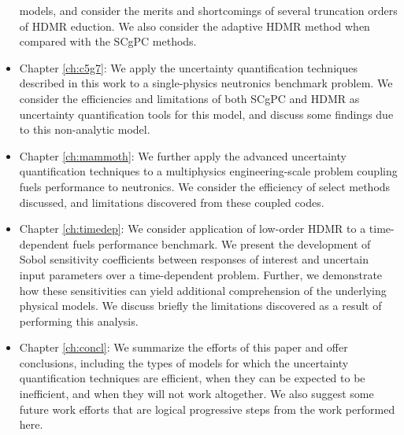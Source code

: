 \begin{itemize}
    models, and consider the merits and shortcomings of several truncation orders of HDMR 
    eduction.  We also consider the adaptive HDMR method when compared with the SCgPC
    methods.
  \item Chapter \ref{ch:c5g7}: We apply the uncertainty quantification techniques described in this work to a
    single-physics neutronics benchmark problem.  We consider the efficiencies and limitations of both
    SCgPC and HDMR as uncertainty
    quantification tools for this model, and discuss some findings due to this non-analytic model. 
  \item Chapter \ref{ch:mammoth}: We further apply the advanced uncertainty quantification techniques to a multiphysics
    engineering-scale problem coupling fuels performance to neutronics.  We consider the efficiency of select
    methods discussed, and limitations discovered from these coupled codes.
  \item Chapter \ref{ch:timedep}: We consider application of low-order HDMR to a time-dependent fuels
    performance benchmark.  We present the development of Sobol sensitivity coefficients between responses of
    interest and uncertain input parameters over a time-dependent problem.  Further, we demonstrate how these
    sensitivities can yield additional comprehension of the underlying physical models.  We discuss briefly
    the limitations discovered as a result of performing this analysis.
  \item Chapter \ref{ch:concl}: We summarize the efforts of this paper and offer conclusions, including the types of models
    for which the uncertainty quantification techniques are efficient, when they can be expected to be
    inefficient, and when they will not work altogether.  We also suggest some future work efforts that are logical
    progressive steps from the work performed here.
\end{itemize}
